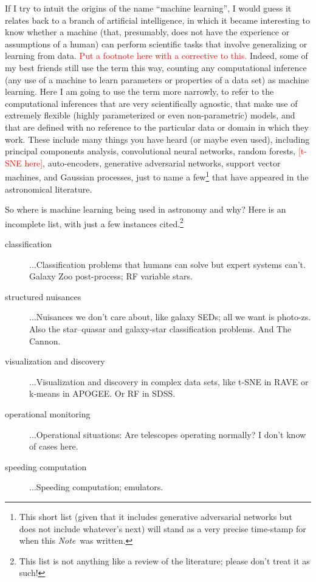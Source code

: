 \documentclass[12pt, twoside, letterpaper]{article}
\newcommand{\documentname}{\textsl{Note}}
\newcommand{\todo}[1]{\textcolor{red}{#1}}  %
\begin{document}
If I try to intuit the origins of the name ``machine learning'',
I would guess it relates back to a branch of artificial intelligence,
in which it became interesting to know whether a machine (that,
presumably, does not have the experience or assumptions of a human)
can perform scientific tasks that involve generalizing or learning from
data. \todo{Put a footnote here with a corrective to this.}
Indeed, some of my best friends still use the term
this way, counting any computational inference (any use of a machine
to learn parameters or properties of a data set) as machine learning.
Here I am going to use the term more narrowly, to refer to the computational
inferences that are very scientifically agnostic, that make use of extremely
flexible (highly parameterized or even non-parametric) models, and
that are defined with no reference to the particular data or domain in
which they work.
These include many things you have heard (or maybe even used),
including principal components analysis, convolutional neural
networks, random forests, \todo{[t-SNE here]}, auto-encoders,
generative adversarial networks, support vector machines,
and Gaussian processes,
just to name a few\footnote{This short list (given
  that it includes generative adversarial networks but does not
  include whatever's next) will stand as a very precise time-stamp for
  when this \documentname\ was written.}
that have appeared in the astronomical literature.

So where is machine learning being used in astronomy and why?  Here is
an incomplete list, with just a few instances cited.\footnote{This
  list is not anything like a review of the literature; please don't
  treat it as such!}
\begin{description}
\item[classification]
...Classification problems that humans can solve but expert systems
can't. Galaxy Zoo post-process; RF variable stars.
\item[structured nuisances]
...Nuisances we don't care about, like galaxy SEDs; all we want is
photo-zs. Also the star--quasar and galaxy-star classification
problems. And The Cannon.
\item[visualization and discovery]
...Visualization and discovery in complex data sets, like t-SNE in RAVE
or k-means in APOGEE. Or RF in SDSS.
\item[operational monitoring]
...Operational situations: Are telescopes operating normally? I don't know
of cases here.
\item[speeding computation]
...Speeding computation; emulators.
\end{description}
\end{document}
